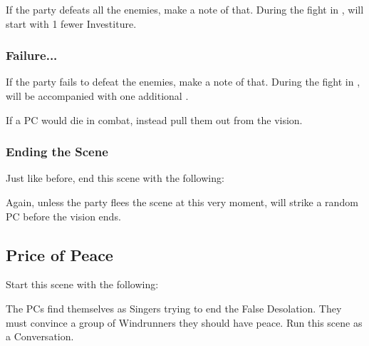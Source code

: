 If the party defeats all the enemies, make a note of that. During the fight in , \enemyMishram{} will start with 1 fewer Investiture.

\subsubsection{Failure...}

If the party fails to defeat the enemies, make a note of that. During the fight in , \enemyMishram{} will be accompanied with one additional \enemySingerWarform{}.

If a PC would die in combat, instead pull them out from the vision.

\subsubsection{Ending the Scene}

Just like before, end this scene with the following:


Again, unless the party flees the scene at this very moment, \enemyMishram{} will strike a random PC before the vision ends.





\subsection{Price of Peace}

Start this scene with the following:


The PCs find themselves as Singers trying to end the False Desolation. They must convince a group of Windrunners they should have peace. Run this scene as a Conversation.

